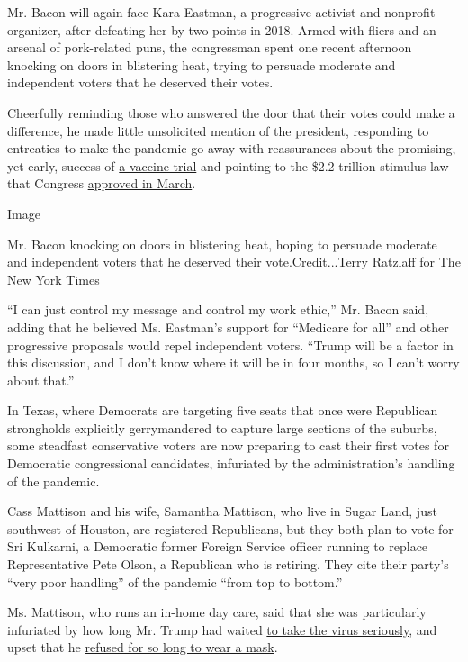 Mr. Bacon will again face Kara Eastman, a progressive activist and
nonprofit organizer, after defeating her by two points in 2018. Armed
with fliers and an arsenal of pork-related puns, the congressman spent
one recent afternoon knocking on doors in blistering heat, trying to
persuade moderate and independent voters that he deserved their votes.

Cheerfully reminding those who answered the door that their votes could
make a difference, he made little unsolicited mention of the president,
responding to entreaties to make the pandemic go away with reassurances
about the promising, yet early, success of
\href{https://www.nytimes.com/2020/07/14/health/cornavirus-vaccine-moderna.html}{a
vaccine trial} and pointing to the \$2.2 trillion stimulus law that
Congress
\href{https://www.nytimes.com/2020/03/27/us/politics/coronavirus-house-voting.html}{approved
in March}.

Image

Mr. Bacon knocking on doors in blistering heat, hoping to persuade
moderate and independent voters that he deserved their
vote.Credit...Terry Ratzlaff for The New York Times

``I can just control my message and control my work ethic,'' Mr. Bacon
said, adding that he believed Ms. Eastman's support for ``Medicare for
all'' and other progressive proposals would repel independent voters.
``Trump will be a factor in this discussion, and I don't know where it
will be in four months, so I can't worry about that.''

In Texas, where Democrats are targeting five seats that once were
Republican strongholds explicitly gerrymandered to capture large
sections of the suburbs, some steadfast conservative voters are now
preparing to cast their first votes for Democratic congressional
candidates, infuriated by the administration's handling of the pandemic.

Cass Mattison and his wife, Samantha Mattison, who live in Sugar Land,
just southwest of Houston, are registered Republicans, but they both
plan to vote for Sri Kulkarni, a Democratic former Foreign Service
officer running to replace Representative Pete Olson, a Republican who
is retiring. They cite their party's ``very poor handling'' of the
pandemic ``from top to bottom.''

Ms. Mattison, who runs an in-home day care, said that she was
particularly infuriated by how long Mr. Trump had waited
\href{https://www.nytimes.com/interactive/2020/us/texas-coronavirus-cases.html}{to
take the virus seriously}, and upset that he
\href{https://www.nytimes.com/2020/07/01/us/coronavirus-masks.html}{refused
for so long to wear a mask}.

